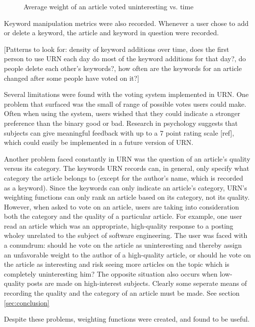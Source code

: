 \begin{figure}[tb]
  \caption{Average weight of an article voted uninteresting vs. time}
  \label{fig:weight-badvote}
\end{figure}

Keyword manipulation metrics were also recorded. Whenever a user chose to add
or delete a keyword, the article and keyword in question were recorded.

[Patterns to look for: density of keyword additions over time, does the first
person to use URN each day do most of the keyword additions for that day?, do
people delete each other's keywords?, how often are the keywords for an article
changed after some people have voted on it?]

Several limitations were found with the voting system implemented in URN.  One
problem that surfaced was the small of range of possible votes users could
make. Often when using the system, users wished that they could indicate a
stronger preference than the binary good or bad. Research in psychology
suggests that subjects can give meaningful feedback with up to a 7 point rating
scale [ref], which could easily be implemented in a future version of URN.

Another problem faced constantly in URN was the question of an article's
quality versus its category. The keywords URN records can, in general, only
specify what category the article belongs to (except for the author's name,
which is recorded as a keyword). Since the keywords can only indicate an
article's category, URN's weighting functions can only rank an article based on
its category, not its quality. However, when asked to vote on an article, users
are taking into consideration both the category and the quality of a particular
article. For example, one user read an article which was an appropriate,
high-quality response to a posting wholey unrelated to the subject of software
engineering. The user was faced with a conundrum: should he vote on the article
as uninteresting and thereby assign an unfavorable weight to the author of a
high-quality article, or should he vote on the article as interesting and risk
seeing more articles on the topic which is completely uninteresting him? The
opposite situation also occurs when low-quality posts are made on high-interest
subjects.  Clearly some seperate means of recording the quality and the
category of an article must be made. See section \ref{sec:conclusion}

Despite these problems, weighting functions were created, and found to be
useful.

